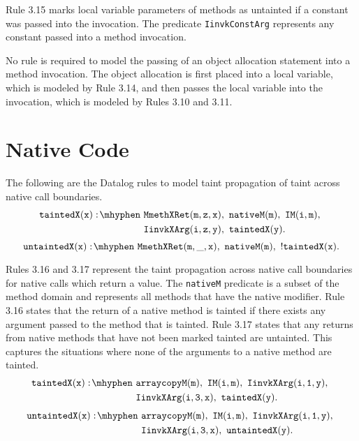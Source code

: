 Rule 3.15 marks local variable parameters of methods as untainted if a constant was passed into the invocation. The predicate \texttt{IinvkConstArg} represents any constant passed into a method invocation.

No rule is required to model the passing of an object allocation statement into a method invocation. The object allocation is first placed into a local variable, which is modeled by Rule 3.14, and then passes the local variable into the invocation, which is modeled by Rules 3.10 and 3.11. 
\section{Native Code}
The following are the Datalog rules to model taint propagation of taint across native call boundaries.
\begin{equation}
  \begin{split}
    \mathtt{taintedX(x) \is} & \mathtt{MmethXRet(m,z,x) \also nativeM(m) \also IM(i,m) \also} \\
    & \mathtt{IinvkXArg(i,z,y) \also taintedX(y).} \\
  \end{split}
\end{equation}
\begin{equation}
  \mathtt{untaintedX(x) \is MmethXRet(m,\_,x) \also nativeM(m) \also !taintedX(x).}
\end{equation}

Rules 3.16 and 3.17 represent the taint propagation across native call boundaries for native calls which return a value. The \texttt{nativeM} predicate is a subset of the method domain and represents all methods that have the native modifier. Rule 3.16 states that the return of a native method is tainted if there exists any argument passed to the method that is tainted. Rule 3.17 states that any returns from native methods that have not been marked tainted are untainted. This captures the situations where none of the arguments to a native method are tainted.
\begin{equation}
  \begin{split}
    \mathtt{taintedX(x) \is} & \mathtt{arraycopyM(m) \also IM(i,m) \also IinvkXArg(i,1,y) \also} \\
    & \mathtt{IinvkXArg(i,3,x) \also taintedX(y).} \\
  \end{split}
\end{equation}
\begin{equation}
  \begin{split}
    \mathtt{untaintedX(x) \is} & \mathtt{arraycopyM(m) \also IM(i,m) \also IinvkXArg(i,1,y) \also} \\
    & \mathtt{IinvkXArg(i,3,x) \also untaintedX(y).} \\
  \end{split}
\end{equation}

